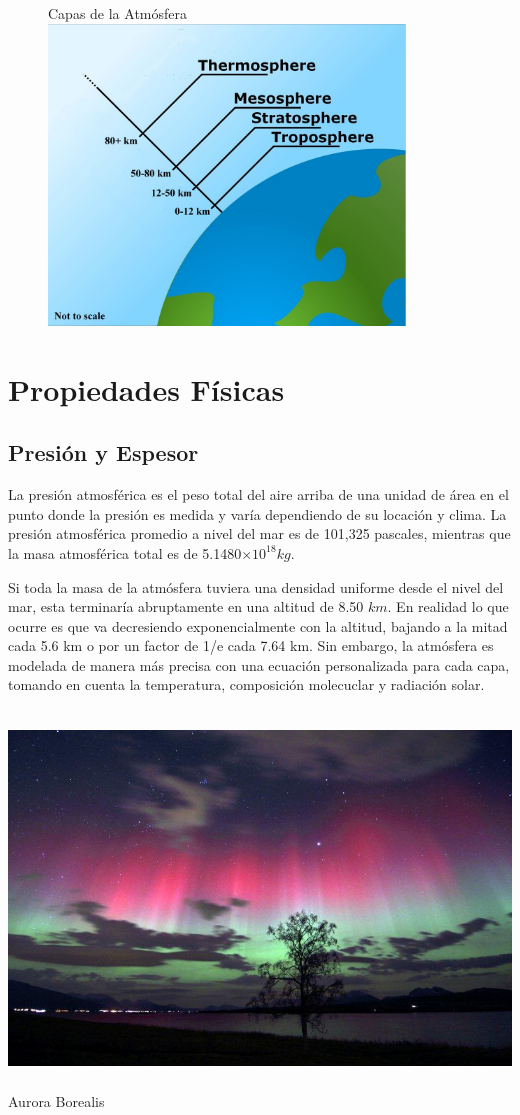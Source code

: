 \documentclass{article} %
\begin{document}
\begin{figure}{Capas de la Atmósfera}
\centering
\includegraphics[height=8cm]{capas.jpg}
\end{figure}

\section{Propiedades Físicas}
	\subsection{Presión y Espesor}
   	La presión atmosférica es el peso total del aire arriba de una unidad de área en el punto donde la presión es medida y varía dependiendo de su locación y clima. La presión atmosférica promedio a nivel del mar es de 101,325 pascales, mientras que la masa atmosférica total es de 5.1480$\times10^{18} kg$.
    
    Si toda la masa de la atmósfera tuviera una densidad uniforme desde el nivel del mar, esta terminaría abruptamente en una altitud de 8.50 $km$. En realidad lo que ocurre es que va decresiendo exponencialmente con la altitud, bajando a la mitad cada 5.6 km o por un factor de 1/e cada 7.64 km. Sin embargo, la atmósfera es modelada de manera más precisa con una ecuación personalizada para cada capa, tomando en cuenta la temperatura, composición molecuclar y radiación solar.


\includegraphics[height=10cm]{auroras.jpg}{Aurora Borealis}
\end{document}
